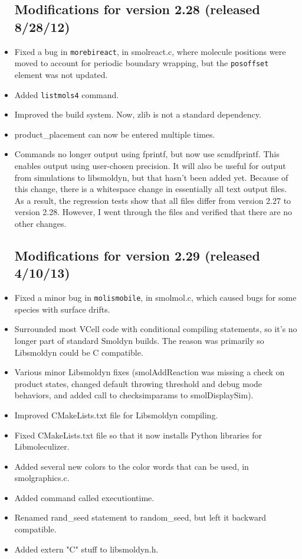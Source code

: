 \documentclass {scrbook}
\newcommand {\ttt} {\texttt}
\begin{document}
\begin{itemize}
\subsection{Modifications for version 2.28 (released 8/28/12)}
\item Fixed a bug in \ttt{morebireact}, in smolreact.c, where molecule positions were moved to account for periodic boundary wrapping, but the \ttt{posoffset} element was not updated.
\item Added \ttt{listmols4} command.
\item Improved the build system. Now, zlib is not a standard dependency.
\item product\_placement can now be entered multiple times.
\item Commands no longer output using fprintf, but now use scmdfprintf. This enables output using user-chosen precision. It will also be useful for output from simulations to libsmoldyn, but that hasn't been added yet. Because of this change, there is a whitespace change in essentially all text output files. As a result, the regression tests show that all files differ from version 2.27 to version 2.28. However, I went through the files and verified that there are no other changes.

\subsection{Modifications for version 2.29 (released 4/10/13)}
\item Fixed a minor bug in \ttt{molismobile}, in smolmol.c, which caused bugs for some species with surface drifts.
\item Surrounded most VCell code with conditional compiling statements, so it's no longer part of standard Smoldyn builds. The reason was primarily so Libsmoldyn could be C compatible.
\item Various minor Libsmoldyn fixes (smolAddReaction was missing a check on product states, changed default throwing threshold and debug mode behaviors, and added call to checksimparams to smolDisplaySim).
\item Improved CMakeLists.txt file for Libsmoldyn compiling.
\item Fixed CMakeLists.txt file so that it now installs Python libraries for Libmoleculizer.
\item Added several new colors to the color words that can be used, in smolgraphics.c.
\item Added command called executiontime.
\item Renamed rand\_seed statement to random\_seed, but left it backward compatible.
\item Added extern "C" stuff to libsmoldyn.h.


\end{itemize}
\end{document}
